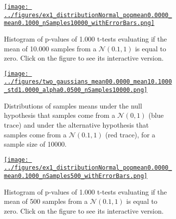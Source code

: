 \documentclass[12pt]{article}
\begin{document}
\begin{enumerate}[(a)]
        \begin{figure}[H]
            \begin{center}
                \begin{subfigure}{0.4\textwidth}
                    \centering
                    \href{https://www.gatsby.ucl.ac.uk/~rapela/neuroinformatics/2023/ws1/figures/ex1_distributionNormal_popmean0.0000_mean0.1000_nSamples10000_withErrorBars.html}{\texttt{[image: ../figures/ex1\_distributionNormal\_popmean0.0000\_mean0.1000\_nSamples10000\_withErrorBars.png]}}
                    \caption{Histogram of p-values of 1.000 t-tests evaluating if the mean of 10.000 samples from a $\mathcal{N}(0.1, 1)$ is equal to zero.  Click on the figure to see its interactive version.}
                    \label{fig:ex1b_part1_a}
                \end{subfigure}
                \hfill
                \begin{subfigure}{0.4\textwidth}
                    \centering
                    \href{https://www.gatsby.ucl.ac.uk/~rapela/neuroinformatics/2023/ws1/figures/two_gaussians_mean00.0000_mean10.1000_std1.0000_alpha0.0500_nSamples10000.html}{\texttt{[image: ../figures/two\_gaussians\_mean00.0000\_mean10.1000\_std1.0000\_alpha0.0500\_nSamples10000.png]}}
                    \caption{Distributions of samples means under the null
                    hypothesis that samples come from a $\mathcal{N}(0, 1)$
                    (blue trace) and under the alternative hypothesis that
                    samples come from a $\mathcal{N}(0.1, 1)$ (red trace), for
                    a sample size of 10000.}
                    \label{fig:ex1b_part1_b}
                \end{subfigure}
                \hfill
                \begin{subfigure}{0.4\textwidth}
                    \centering
                    \href{https://www.gatsby.ucl.ac.uk/~rapela/neuroinformatics/2023/ws1/figures/ex1_distributionNormal_popmean0.0000_mean0.1000_nSamples500_withErrorBars.html}{\texttt{[image: ../figures/ex1\_distributionNormal\_popmean0.0000\_mean0.1000\_nSamples500\_withErrorBars.png]}}
                    \caption{Histogram of p-values of 1.000 t-tests evaluating if the mean of 500 samples from a $\mathcal{N}(0.1, 1)$ is equal to zero.  Click on the figure to see its interactive version.}
                    \label{fig:ex1b_part1_c}
                \end{subfigure}
                \hfill
                \begin{subfigure}{0.4\textwidth}

\end{subfigure}
\end{center}
\end{figure}
\end{enumerate}
\end{document}
